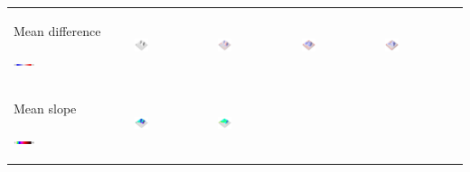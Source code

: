 \documentclass[prodmode,acmtochi]{acmsmall} %
\begin{document}
\begin{table}
{\begin{tabular}{m{} m{} m{} m{} m{}}
%
Mean difference \par \vspace{0.5em} \includegraphics[width=0.19\textwidth]{images/legends/diff_legend.pdf} & 
\includegraphics[width=0.19\textwidth]{images/render_3d/dem_difference_1.png} &
\includegraphics[width=0.19\textwidth]{images/render_3d/mean_dem_regression_difference_1.png} &
\includegraphics[width=0.19\textwidth]{images/render_3d/mean_dem_regression_difference_2.png} &
\includegraphics[width=0.19\textwidth]{images/render_3d/mean_dem_regression_difference_3.png}\\
%
Mean slope \par \vspace{0.5em} \includegraphics[width=0.19\textwidth]{images/legends/slope_legend.pdf} & 
\includegraphics[width=0.19\textwidth]{images/render_3d/slope_1.png} &
\includegraphics[width=0.19\textwidth]{images/render_3d/mean_slope_1.png} &

\end{tabular}}
\end{table}
\end{document}
